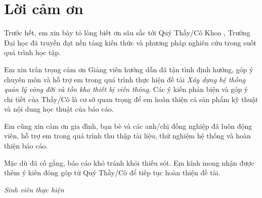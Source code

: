 \chapter*{Lời cảm ơn}

Trước hết, em xin bày tỏ lòng biết ơn sâu sắc tới Quý Thầy/Cô Khoa \dotfill, Trường Đại học \dotfill đã truyền đạt nền tảng kiến thức và phương pháp nghiên cứu trong suốt quá trình học tập.

Em xin trân trọng cảm ơn Giảng viên hướng dẫn đã tận tình định hướng, góp ý chuyên môn và hỗ trợ em trong quá trình thực hiện đề tài \textit{Xây dựng hệ thống quản lý vòng đời và tồn kho thiết bị viễn thông}. Các ý kiến phản biện và góp ý chi tiết của Thầy/Cô là cơ sở quan trọng để em hoàn thiện cả sản phẩm kỹ thuật và nội dung học thuật của báo cáo.

Em cũng xin cảm ơn gia đình, bạn bè và các anh/chị đồng nghiệp đã luôn động viên, hỗ trợ em trong quá trình thu thập tài liệu, thử nghiệm hệ thống và hoàn thiện báo cáo.

Mặc dù đã cố gắng, báo cáo khó tránh khỏi thiếu sót. Em kính mong nhận được thêm ý kiến đóng góp từ Quý Thầy/Cô để tiếp tục hoàn thiện đề tài.

\begin{flushright}
\textit{Sinh viên thực hiện}
\end{flushright}
